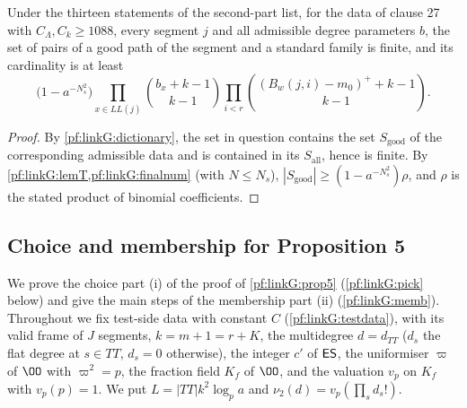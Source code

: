 \begin{theorem}\label{pf:linkG:gpw}
Under the thirteen statements of the second-part list, for the data of clause 27 with $C_\Lambda,C_k\ge1088$, every segment $j$
and all admissible degree parameters $b$, the set of pairs of a good path of the segment and a standard family is finite,
and its cardinality is at least
\[
\bigl(1-a^{-N_s^2}\bigr)\prod_{x\in LL(j)}\binom{b_x+k-1}{k-1}\prod_{i<r}\binom{(B_w(j,i)-m_0)^++k-1}{k-1}.
\]
\end{theorem}

\begin{proof}
By \cref{pf:linkG:dictionary}, the set in question contains the set $S_{\mathrm{good}}$ of the corresponding admissible data
and is contained in its $S_{\mathrm{all}}$, hence is finite. By \cref{pf:linkG:lemT,pf:linkG:finalnum} (with $N\le N_s$),
$|S_{\mathrm{good}}|\ge(1-a^{-N_s^2})\rho$, and $\rho$ is the stated product of binomial coefficients.
\end{proof}

\subsection{Choice and membership for Proposition 5}\label{sec:pf:linkG:pick}

We prove the choice part (i) of the proof of \cref{pf:linkG:prop5} (\cref{pf:linkG:pick} below) and give the main steps of the
membership part (ii) (\cref{pf:linkG:memb}). Throughout we fix test-side data with constant $C$ (\cref{pf:linkG:testdata}),
with its valid frame of $J$ segments, $k=m+1=r+K$, the multidegree $d=d_{TT}$ ($d_s$ the flat degree at $s\in TT$, $d_s=0$
otherwise), the integer $c'$ of $\mathsf{ES}$, the uniformiser $\varpi$ of $\OO$ with $\varpi^2=p$, the fraction field $K_f$ of
$\OO$, and the valuation $v_p$ on $K_f$ with $v_p(p)=1$. We put $L=|TT|k^2\log_pa$ and $\nu_2(d)=v_p(\prod_sd_s!)$.

